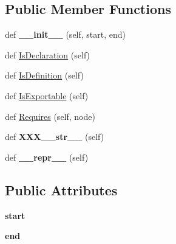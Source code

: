 \subsection*{Public Member Functions}
\begin{DoxyCompactItemize}
\item 
def {\bfseries \+\_\+\+\_\+init\+\_\+\+\_\+} (self, start, end)\hypertarget{classcpp_1_1ast_1_1Node_a2cbd6969346645259afc3be51faae904}{}\label{classcpp_1_1ast_1_1Node_a2cbd6969346645259afc3be51faae904}

\item 
def \hyperlink{classcpp_1_1ast_1_1Node_ab3eca703a79fb65bc25dfbcb7547c79e}{Is\+Declaration} (self)
\item 
def \hyperlink{classcpp_1_1ast_1_1Node_a684ee9a357168e7e07a24fc6812f66e6}{Is\+Definition} (self)
\item 
def \hyperlink{classcpp_1_1ast_1_1Node_a313273874ccf578485006d4000128234}{Is\+Exportable} (self)
\item 
def \hyperlink{classcpp_1_1ast_1_1Node_a31ae211f954a8c578ef16226df5ac8c8}{Requires} (self, node)
\item 
def {\bfseries X\+X\+X\+\_\+\+\_\+str\+\_\+\+\_\+} (self)\hypertarget{classcpp_1_1ast_1_1Node_ab5dfeabcbcd7c1f5feb8522edffb8b4a}{}\label{classcpp_1_1ast_1_1Node_ab5dfeabcbcd7c1f5feb8522edffb8b4a}

\item 
def {\bfseries \+\_\+\+\_\+repr\+\_\+\+\_\+} (self)\hypertarget{classcpp_1_1ast_1_1Node_ab89915656a60c7b7c752e5baa607c532}{}\label{classcpp_1_1ast_1_1Node_ab89915656a60c7b7c752e5baa607c532}

\end{DoxyCompactItemize}
\subsection*{Public Attributes}
\begin{DoxyCompactItemize}
\item 
{\bfseries start}\hypertarget{classcpp_1_1ast_1_1Node_a7b2aa97e6a049bb1a93aea48c48f1f44}{}\label{classcpp_1_1ast_1_1Node_a7b2aa97e6a049bb1a93aea48c48f1f44}

\item 
{\bfseries end}\hypertarget{classcpp_1_1ast_1_1Node_a3c5e5246ccf619df28eca02e29d69647}{}\label{classcpp_1_1ast_1_1Node_a3c5e5246ccf619df28eca02e29d69647}

\end{DoxyCompactItemize}


